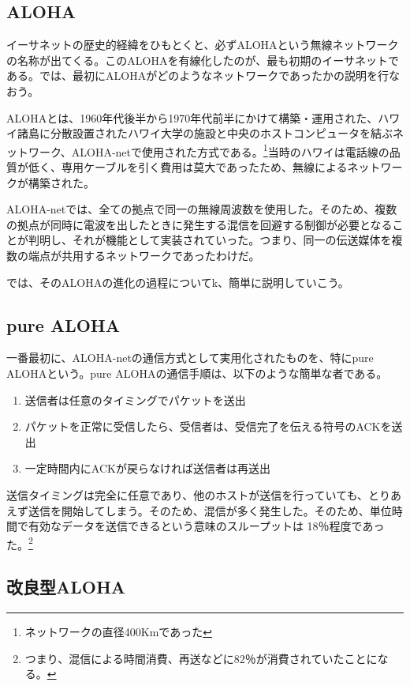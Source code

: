 \subsection{ALOHA}

イーサネットの歴史的経緯をひもとくと、必ずALOHAという無線ネットワークの名称が出てくる。このALOHAを有線化したのが、最も初期のイーサネットである。では、最初にALOHAがどのようなネットワークであったかの説明を行なおう。

ALOHAとは、1960年代後半から1970年代前半にかけて構築・運用された、ハワイ諸島に分散設置されたハワイ大学の施設と中央のホストコンピュータを結ぶネットワーク、ALOHA-netで使用された方式である。\footnote{ネットワークの直径400Kmであった}当時のハワイは電話線の品質が低く、専用ケーブルを引く費用は莫大であったため、無線によるネットワークが構築された。

ALOHA-netでは、全ての拠点で同一の無線周波数を使用した。そのため、複数の拠点が同時に電波を出したときに発生する混信を回避する制御が必要となることが判明し、それが機能として実装されていった。つまり、同一の伝送媒体を複数の端点が共用するネットワークであったわけだ。

では、そのALOHAの進化の過程についてk、簡単に説明していこう。

\subsection{pure ALOHA}

一番最初に、ALOHA-netの通信方式として実用化されたものを、特にpure ALOHAという。pure ALOHAの通信手順は、以下のような簡単な者である。

\begin{enumerate}
\item 送信者は任意のタイミングでパケットを送出
\item パケットを正常に受信したら、受信者は、受信完了を伝える符号のACKを送出
\item 一定時間内にACKが戻らなければ送信者は再送出
\end{enumerate}
送信タイミングは完全に任意であり、他のホストが送信を行っていても、とりあえず送信を開始してしまう。そのため、混信が多く発生した。そのため、単位時間で有効なデータを送信できるという意味のスループットは 18％程度であった。\footnote{つまり、混信による時間消費、再送などに82％が消費されていたことになる。}

\subsection{改良型ALOHA}

